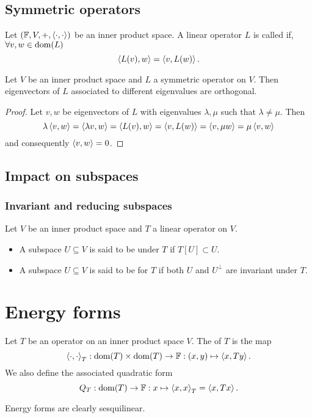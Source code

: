 \subsection{Symmetric operators}
\begin{definition}
Let $(\mathbb{F},V,+,\left\langle \cdot,\cdot \right\rangle)$ be an inner product space. A linear operator $L$ is called  if, $\forall v,w\in \operatorname{dom}(L)$
\[ \left\langle L(v),w \right\rangle = \left\langle v,L(w) \right\rangle. \]
\end{definition}

\begin{proposition}
Let $V$ be an inner product space and $L$ a symmetric operator on $V$. Then eigenvectors of $L$ associated to different eigenvalues are orthogonal.
\end{proposition}
\begin{proof}
Let $v,w$ be eigenvectors of $L$ with eigenvalues $\lambda, \mu$ such that $\lambda \neq \mu$. Then
\[ \lambda\left\langle v,w \right\rangle = \left\langle \lambda v,w \right\rangle=\left\langle L(v),w \right\rangle = \left\langle v,L(w) \right\rangle = \left\langle v,\mu w \right\rangle = \mu \left\langle v,w \right\rangle \]
and consequently $\left\langle v,w \right\rangle =0$.
\end{proof}

\subsection{Impact on subspaces}
\subsubsection{Invariant and reducing subspaces}
\begin{definition}
Let $V$ be an inner product space and $T$ a linear operator on $V$.
\begin{itemize}
\item A subspace $U\subseteq V$ is said to be  under $T$ if $T[U] \subset U$.
\item A subspace $U\subseteq V$ is said to be  for $T$ if both $U$ and $U^\perp$ are invariant under $T$.
\end{itemize}
\end{definition}

\section{Energy forms}
\begin{definition}
Let $T$ be an operator on an inner product space $V$. The  of $T$ is the map
\[ \left\langle \cdot, \cdot \right\rangle_T: \operatorname{dom}(T)\times \operatorname{dom}(T) \to \mathbb{F}: (x,y) \mapsto \left\langle x,Ty \right\rangle. \]
We also define the associated quadratic form
\[ Q_T: \operatorname{dom}(T)\to \mathbb{F}: x\mapsto \left\langle x,x \right\rangle_T = \left\langle x,Tx \right\rangle. \]
\end{definition}
Energy forms are clearly sesquilinear.

